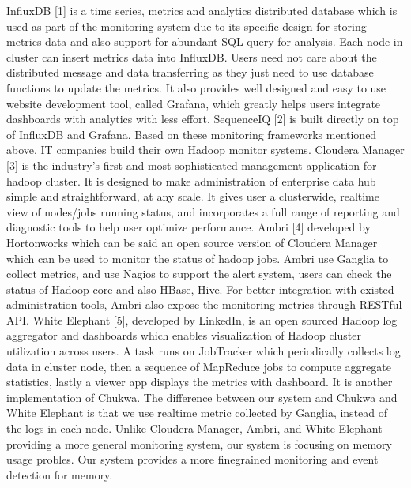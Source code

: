 InfluxDB [1] is a time series, metrics and analytics distributed database which is used as part of the monitoring system due to its specific design for storing metrics data and also support for abundant SQL query for analysis. Each node in cluster can insert metrics data into InfluxDB. Users need not care about the distributed message and data transferring as they just need to use database functions to update the metrics. It also provides well designed and easy to use website development tool, called Grafana, which greatly helps users integrate dashboards with analytics with less effort. SequenceIQ [2] is built directly on top of InfluxDB and Grafana.
Based on these monitoring frameworks mentioned above, IT companies build their own Hadoop monitor systems.
Cloudera Manager [3] is the industry’s first and most sophisticated management application for hadoop cluster. It is designed to make administration of enterprise data hub simple and straightforward, at any scale. It gives user a cluster­wide, real­time view of nodes/jobs running status, and incorporates a full range of reporting and diagnostic tools to help user optimize performance.
Ambri [4] developed by Hortonworks which can be said an open source version of Cloudera Manager which can be used to monitor the status of hadoop jobs. Ambri use Ganglia to collect metrics, and use Nagios to support the alert system, users can check the status of Hadoop core and also HBase, Hive. For better integration with existed administration tools, Ambri also expose the monitoring metrics through RESTful API. White Elephant [5], developed by LinkedIn, is an open sourced Hadoop log aggregator and dashboards which enables visualization of Hadoop cluster utilization across users. A task runs on JobTracker which periodically collects log data in cluster node, then a sequence of MapReduce jobs to compute aggregate statistics, lastly a viewer app displays the metrics with dashboard. It is another implementation of Chukwa.
The difference between our system and Chukwa and White Elephant is that we use real­time metric collected by Ganglia, instead of the logs in each node. Unlike Cloudera Manager, Ambri, and White Elephant providing a more general monitoring system, our system is focusing on memory usage probles. Our system provides a more fine­grained monitoring and event detection for memory.


